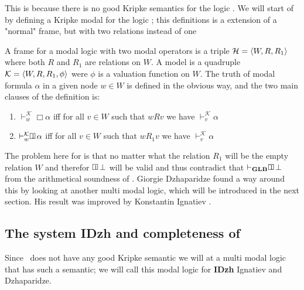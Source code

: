 \documentclass[../main.tex]{subfiles}
\begin{document}
This is because there is no good Kripke semantics for the logic \GLB. We will
start of by defining a Kripke modal for the logic \GLB; this definitions is a
extension of a "normal" frame, but with two relations instead of one

\begin{defi}
	A  frame for a modal logic with two modal operators is a triple
	$\mathcal{H}=\langle W,R,R_1\rangle$ where both $R$ and $R_1$ are relations on
	$W$. A model is a quadruple $\mathcal{K}=\langle W, R,R_1,\phi\rangle$ were
	$\phi$ is a valuation function on $W$. The truth of modal formula
	$\alpha$ in a given node $w\in W$ is defined in the obvious way, and
	the two main clauses of the definition is:
	\begin{enumerate}
		\item $\vdash_w^\mathcal{K}\Box\alpha$ iff for all $v\in W$ such
			that $wRv$ we have $\vdash_v^\mathcal{K}\alpha$
		\item $\vdash_w^\mathcal{K}\OneBox\alpha$ iff for all $v\in W$ such
			that $wR_1v$ we have $\vdash_v^\mathcal{K}\alpha$
	\end{enumerate}
\end{defi}
The problem here for is that no matter what the relation $R_1$ will be the
empty relation $W$ and therefor $\OneBox\bot$ will be valid and thus contradict
that $\vdash_\GLB\OneBox\bot$ from the arithmetical  soundness of \GLB. Giorgie
Dzhaparidze found a way around this by looking at another multi modal logic,
which will be introduced in the next section. His result was improved  by
Konstantin Ignatiev .

\subsection{The system \textbf{IDzh} and completeness of \GLB}

Since \GLB\ does not have any good Kripke semantic we will at a multi modal logic that
has such a semantic; we will call this modal logic for \textbf{IDzh} Ignatiev
and Dzhaparidze.
\end{document}
